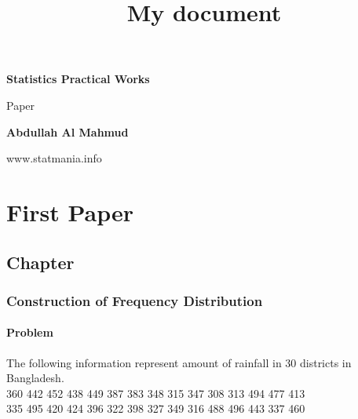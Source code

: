 \documentclass[a4paper,oneside, margin=1.4in]{book}
\title{My document}
\begin{document}
\frontmatter

\begin{titlepage}
    \begin{center}
        \vspace*{1cm}
            
        \Huge
        \textbf{Statistics Practical Works}
            
        \vspace{0.5cm}
        \LARGE
        Paper
            
        \vspace{1.5cm}
            
        \textbf{Abdullah Al Mahmud}
            
        \vfill
            
            
        \vspace{0.8cm}
            
            
        \Large
        www.statmania.info\\
            
    \end{center}
\end{titlepage}


\tableofcontents


\mainmatter

\part{First Paper}
\chapter{Chapter} 
\section{Construction of Frequency Distribution}

\subsection{Problem}

The following information represent amount of rainfall in 30 districts in Bangladesh. \\

360 442 452 438 449 387 383 348 315 347 308 313 494 477 413 \\
335 495 420 424 396 322 398 327 349 316 488 496 443 337 460 \\
\end{document}
